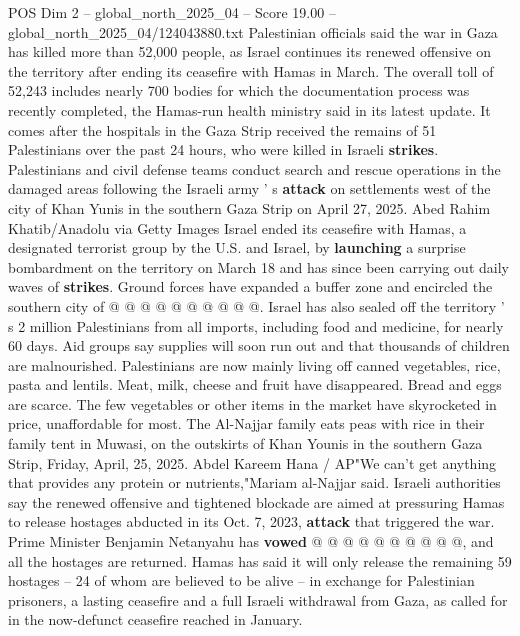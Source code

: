\begin{textsample}{POS Dim 2 – global\_north\_2025\_04 – Score 19.00 – global\_north\_2025\_04/124043880.txt}  \label{ex:f2_pos_423}
Palestinian officials said the war in Gaza has killed more than 52,000 people, as Israel continues its renewed offensive on the territory after ending its ceasefire with Hamas in March.
The overall toll of 52,243 includes nearly 700 bodies for which the documentation process was recently completed, the Hamas-run health ministry said in its latest update.
It comes after the hospitals in the Gaza Strip received the remains of 51 Palestinians over the past 24 hours, who were killed in Israeli \textbf{strikes}.
Palestinians and civil defense teams conduct search and rescue operations in the damaged areas following the Israeli army ' s \textbf{attack} on settlements west of the city of Khan Yunis in the southern Gaza Strip on April 27, 2025.
Abed Rahim Khatib/Anadolu via Getty Images Israel ended its ceasefire with Hamas, a designated terrorist group by the U.S. and Israel, by \textbf{launching} a surprise bombardment on the territory on March 18 and has since been carrying out daily waves of \textbf{strikes}.
Ground forces have expanded a buffer zone and encircled the southern city of @ @ @ @ @ @ @ @ @ @.
Israel has also sealed off the territory ' s 2 million Palestinians from all imports, including food and medicine, for nearly 60 days.
Aid groups say supplies will soon run out and that thousands of children are malnourished.
Palestinians are now mainly living off canned vegetables, rice, pasta and lentils.
Meat, milk, cheese and fruit have disappeared.
Bread and eggs are scarce.
The few vegetables or other items in the market have skyrocketed in price, unaffordable for most.
The Al-Najjar family eats peas with rice in their family tent in Muwasi, on the outskirts of Khan Younis in the southern Gaza Strip, Friday, April, 25, 2025.
Abdel Kareem Hana / AP"We can't get anything that provides any protein or nutrients,"Mariam al-Najjar said.
Israeli authorities say the renewed offensive and tightened blockade are aimed at pressuring Hamas to release hostages abducted in its Oct. 7, 2023, \textbf{attack} that triggered the war.
Prime Minister Benjamin Netanyahu has \textbf{vowed} @ @ @ @ @ @ @ @ @ @, and all the hostages are returned.
Hamas has said it will only release the remaining 59 hostages -- 24 of whom are believed to be alive -- in exchange for Palestinian prisoners, a lasting ceasefire and a full Israeli withdrawal from Gaza, as called for in the now-defunct ceasefire reached in January.

\end{textsample}
